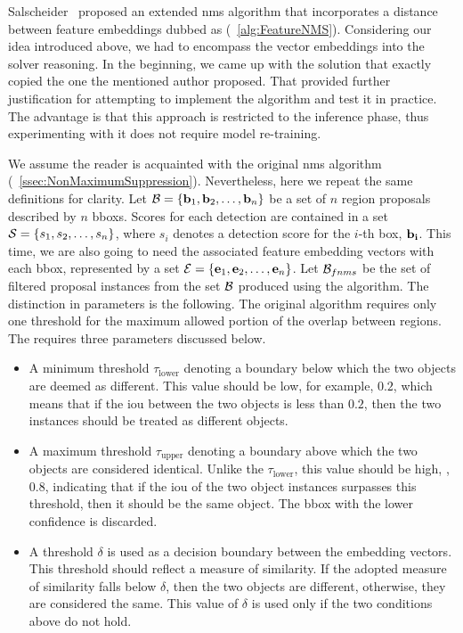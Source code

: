 Salscheider~\cite{salscheider2020featurenms} proposed an extended \gls{nms} algorithm that incorporates a distance between feature embeddings dubbed as \featurenms{} (\algtext{}~\ref{alg:FeatureNMS}). Considering our idea introduced above, we had to encompass the vector embeddings into the solver reasoning. In the beginning, we came up with the solution that exactly copied the one the mentioned author proposed. That provided further justification for attempting to implement the algorithm and test it in practice. The advantage is that this approach is restricted to the inference phase, thus experimenting with it does not require model re-training.

\def\threshlower{\tau_{\text{lower}}}
\def\threshupper{\tau_{\text{upper}}}
\def\threshsim{\delta}

We assume the reader is acquainted with the original \gls{nms} algorithm (\sectiontext{}~\ref{ssec:NonMaximumSuppression}). Nevertheless, here we repeat the same definitions for clarity. Let $\mathcal{B} = \left\{ {\mathbf{b}_1, \mathbf{b}_2, \dots, \mathbf{b}_n} \right\}$ be a set of $n$ region proposals described by $n$ \glspl{bbox}. Scores for each detection are contained in a set $\mathcal{S} = \left\{ {s_1, s_2, \dots, s_n} \right\}$, where $s_i$ denotes a detection score for the $i$-th box, $\mathbf{b_i}$. This time, we are also going to need the associated feature embedding vectors with each \gls{bbox}, represented by a set $\mathcal{E} = \left\{ {\mathbf{e}_1, \mathbf{e}_2, \dots, \mathbf{e}_n} \right\}$. Let $\mathcal{B}_{fnms}$ be  the set of filtered proposal instances from the set $\mathcal{B}$ produced using the \featurenms{} algorithm. The distinction in parameters is the following. The original algorithm requires only one threshold for the maximum allowed portion of the overlap between regions. The \featurenms{} requires three parameters discussed below.
\begin{itemize}
    \item A minimum threshold $\threshlower$ denoting a boundary below which the two objects are deemed as different. This value should be low, for example, $0.2$, which means that if the \gls{iou} between the two objects is less than $0.2$, then the two instances should be treated as different objects.
    \item A maximum threshold $\threshupper$ denoting a boundary above which the two objects are considered identical. Unlike the $\threshlower$, this value should be high, \egtext{}, $0.8$, indicating that if the \gls{iou} of the two object instances surpasses this threshold, then it should be the same object. The \gls{bbox} with the lower confidence is discarded.
    \item A threshold $\threshsim$ is used as a decision boundary between the embedding vectors. This threshold should reflect a measure of similarity. If the adopted measure of similarity falls below $\threshsim$, then the two objects are different, otherwise, they are considered the same. This value of $\threshsim$ is used only if the two conditions above do not hold.
\end{itemize}

